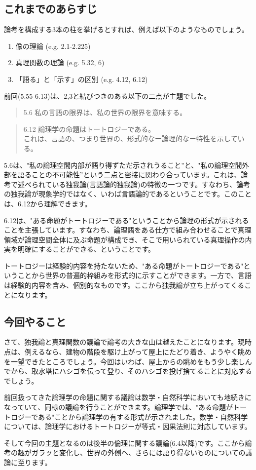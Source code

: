 \documentclass[12pt]{jsarticle}
\begin{document}
\subsection*{これまでのあらすじ}
論考を構成する3本の柱を挙げるとすれば、例えば以下のようなものでしょう。
\begin{enumerate}
\item 像の理論 (e.g. 2.1-2.225)
\item 真理関数の理論 (e.g. 5.32, 6)
\item 「語る」と「示す」の区別 (e.g. 4.12, 6.12)
\end{enumerate}
\par
前回(5.55-6.13)は、2,3と結びつきのある以下の二点が主題でした。
\begin{quote}
5.6 私の言語の限界は、私の世界の限界を意味する。
\end{quote}
\begin{quote}
6.12 論理学の命題はトートロジーである。\\
これは、言語の、つまり世界の、形式的なー論理的なー特性を示している。
\end{quote}
\par
5.6は、"私の論理空間内部が語り得ずただ示されうること”と、"私の論理空間外部を語ることの不可能性”という二点と密接に関わり合っています。これは、論考で述べられている独我論(言語論的独我論)の特徴の一つです。すなわち、論考の独我論が現象学的ではなく、いわば言語論的であるということです。このことは、6.12から理解できます。
\par
6.12は、"ある命題がトートロジーである"ということから論理の形式が示されることを主張しています。すなわち、論理語をある仕方で組み合わせることで真理領域が論理空間全体に及ぶ命題が構成でき、そこで用いられている真理操作の内実を明確にすることができる、ということです。 
\par
トートロジーは経験的内容を持たないため、"ある命題がトートロジーである"ということから世界の普遍的枠組みを形式的に示すことができます。一方で、言語は経験的内容を含み、個別的なものです。ここから独我論が立ち上がってくることになります。 

\subsection*{今回やること}
さて、独我論と真理関数の議論で論考の大きな山は越えたことになります。現時点は、例えるなら、建物の階段を駆け上がって屋上にたどり着き、ようやく眺めを一望できたところでしょう。今回はいわば、屋上からの眺めをもう少し楽しんでから、取水塔にハシゴを伝って登り、そのハシゴを投げ捨てることに対応するでしょう。
\par
前回扱ってきた論理学の命題に関する議論は数学・自然科学においても地続きになっていて、同様の議論を行うことができます。論理学では、"ある命題がトートロジーである"ことから論理学の有する形式が示されました。数学・自然科学については、論理学におけるトートロジーが等式・因果法則に対応しています。
\par
そして今回の主題となるのは後半の倫理に関する議論(6.4以降)です。ここから論考の趣がガラッと変化し、世界の外側へ、さらには語り得ないものについての議論に至ります。
\end{document}
